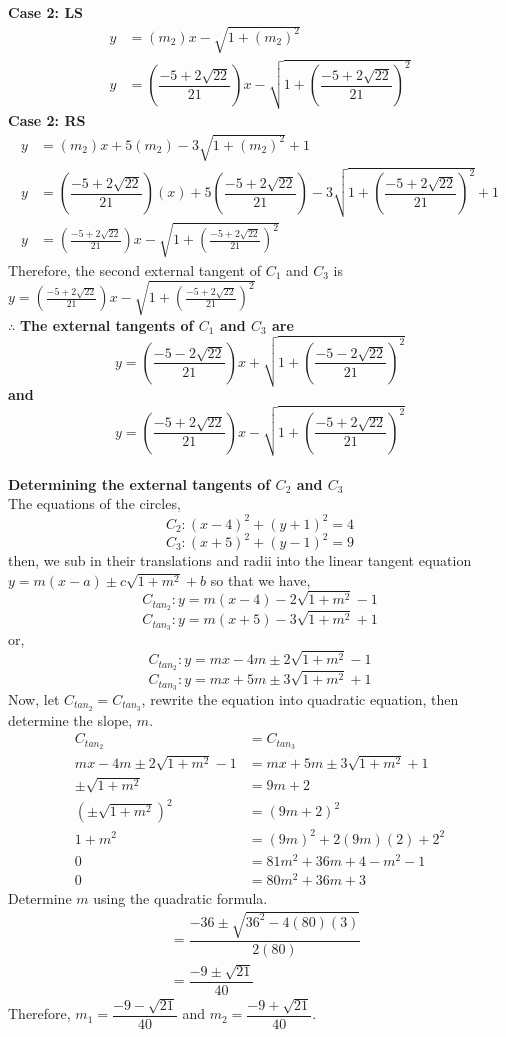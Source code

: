 \documentclass[12pt]{book}
\begin{document}
\begin{enumerate}
\textbf{Case 2: LS}
\begin{align}
    y &= (m_2)x - \sqrt{1+(m_2)^{2}} \\
    y &= \left(\dfrac{-5+2\sqrt{22}}{21}\right)x - \sqrt{1+ \left(\dfrac{-5+2\sqrt{22}}{21}\right)^2}
\end{align}
\textbf{Case 2: RS}
\begin{align}
    y &= (m_2)x + 5(m_2) - 3\sqrt{1+(m_2)^{2}}+1 \\
    y &=  \left(\dfrac{-5+2\sqrt{22}}{21}\right)(x)+5\left(\dfrac{-5+2\sqrt{22}}{21}\right)-3\sqrt{1+ \left(\dfrac{-5+2\sqrt{22}}{21}\right)^2}+1 \\
    y &= \left(\frac{-5+2\sqrt{22}}{21}\right)x-\sqrt{1+\left(\frac{-5+2\sqrt{22}}{21}\right)^{2}}
\end{align}
Therefore, the second external tangent of $C_1$ and $C_3$  is $y=\left(\frac{-5+2\sqrt{22}}{21}\right)x-\sqrt{1+\left(\frac{-5+2\sqrt{22}}{21}\right)^{2}}$\\

$\therefore$ \textbf{The external tangents of $C_1$ and $C_3$ are } $$y=\left(\frac{-5-2\sqrt{22}}{21}\right)x+\sqrt{1+\left(\frac{-5-2\sqrt{22}}{21}\right)^{2}}$$  \textbf{and} $$y=\left(\frac{-5+2\sqrt{22}}{21}\right)x-\sqrt{1+\left(\frac{-5+2\sqrt{22}}{21}\right)^{2}}$$\\


\textbf{Determining the external tangents of $C_2$ and $C_3$}\\
The equations of the circles,
$$C_2: \left(x-4\right)^{2}+\left(y+1\right)^{2}=4$$
$$C_3: \left(x+5\right)^{2}+\left(y-1\right)^{2}=9$$
then, we sub in their translations and radii into the linear tangent equation $y = m(x-a) \pm c\sqrt{1+m^2} + b$ so that we have,
$$C_{tan_2}: y=m\left(x-4\right)-2\sqrt{1+m^{2}}-1$$
$$C_{tan_3}: y=m\left(x+5\right)-3\sqrt{1+m^{2}}+1$$
or,
$$C_{tan_2}: y=mx - 4m \pm 2\sqrt{1+m^{2}} - 1$$
$$C_{tan_3}: y=mx + 5m \pm 3\sqrt{1+m^{2}} + 1$$
Now, let $C_{tan_2} = C_{tan_3}$, rewrite the equation into quadratic equation, then determine the slope, $m$.
\begin{align}
    C_{tan_2} &= C_{tan_3} \\
    mx - 4m \pm 2\sqrt{1+m^{2}} - 1 &= mx + 5m \pm 3\sqrt{1+m^{2}}+1 \\
    \pm\sqrt{1+m^{2}} &= 9m +2\\
    \left(\pm\sqrt{1+m^{2}}\right)^2 &= (9m +2)^2 \\
    1+m^2 &= (9m)^2 + 2(9m)(2) + 2^2 \\
    0 &= 81m^2 + 36m + 4 -m^2-1 \\
    0 &= 80m^2 + 36m + 3
\end{align}
Determine $m$ using the quadratic formula.
\begin{align}
    &= \dfrac{-36 \pm \sqrt{36^2 - 4(80)(3)}}{2(80)} \\
    &= \dfrac{-9\pm \sqrt{21}}{40}
\end{align}
Therefore, $m_1 = \dfrac{-9- \sqrt{21}}{40}$ and $m_2 = \dfrac{-9+ \sqrt{21}}{40}$.\\


\end{enumerate}
\end{document}
